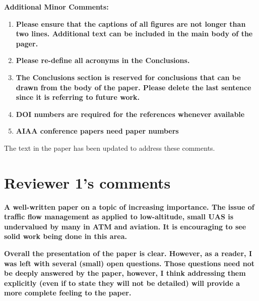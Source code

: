 \documentclass[submit]{aiaa-pretty}
\begin{document}
\textbf{Additional Minor Comments:}
\begin{enumerate}
\item \textbf{Please ensure that the captions of all figures are not longer than two lines.  Additional text can be included in the main body of the pager.}
\item \textbf{Please re-define all acronyms in the Conclusions.}
\item \textbf{The Conclusions section is reserved for conclusions that can be drawn from the body of the paper.  Please delete the last sentence since it is referring to future work.}
\item \textbf{DOI numbers are required for the references whenever available}
\item \textbf{AIAA conference papers need paper numbers}
\end{enumerate}
The text in the paper has been updated to address these comments.

\section{Reviewer 1's comments}

\textbf{A well-written paper on a topic of increasing importance.  The issue of traffic flow management as applied to low-altitude, small UAS is undervalued by many in ATM and aviation.  It is encouraging to see solid work being done in this area.}

\textbf{Overall the presentation of the paper is clear.  However, as a reader, I was left with several (small) open questions.  Those questions need not be deeply answered by the paper, however, I think addressing them explicitly (even if to state they will not be detailed) will provide a more complete feeling to the paper.}
\end{document}

